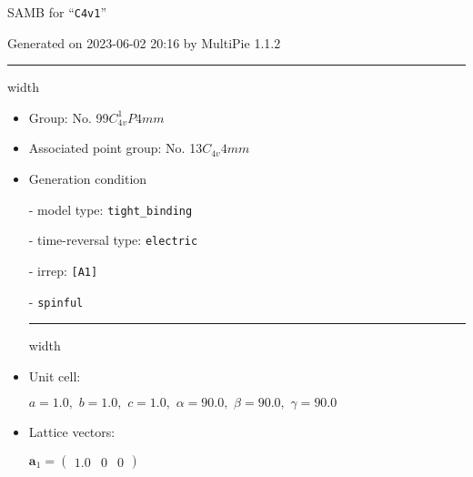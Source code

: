\documentclass[fleqn,10pt,landscape]{article}
\begin{document}
\setcounter{MaxMatrixCols}{16}

\setlength{\baselineskip}{16pt}
\footnotesize
\begin{center}
\LARGE
SAMB for ``\texttt{C4v1}''
\end{center}
\begin{flushright}
Generated on 2023-06-02 20:16 by MultiPie 1.1.2
\end{flushright}
\vspace{1cm}


 \hfil \hrule height 1mm width \textwidth \hfil

\begin{itemize}
\item Group: No. 99\quad$C_{4v}^{1}$\quad$P4mm$\quad[ tetragonal ]

\item Associated point group: No. 13\quad$C_{4v}$\quad$4mm$\quad[ tetragonal ]

\vspace{5mm}

\item Generation condition

\quad - model type: \texttt{tight_binding}

\quad - time-reversal type: \texttt{electric}

\quad - irrep: \texttt{[A1]}

\quad - \texttt{spinful}


 \hfil \hrule height 1mm width \textwidth \hfil

\item Unit cell:

\quad $a=1.0,\,\, b=1.0,\,\, c=1.0,\,\, \alpha=90.0,\,\, \beta=90.0,\,\, \gamma=90.0$

\item Lattice vectors:

\quad $\bm{a}_1=\begin{pmatrix} 1.0 & 0 & 0 \end{pmatrix}$


\end{itemize}
\end{document}
